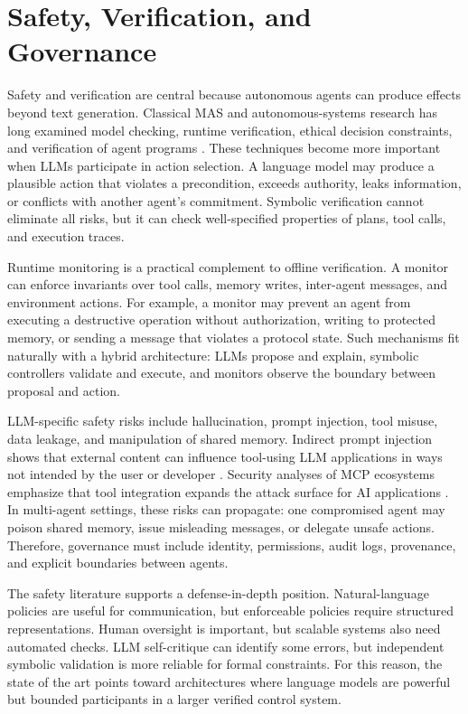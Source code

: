 \section{Safety, Verification, and Governance}

Safety and verification are central because autonomous agents can produce effects beyond text generation. Classical MAS and autonomous-systems research has long examined model checking, runtime verification, ethical decision constraints, and verification of agent programs \cite{fisher2013verifying,bordini2006model,dennis2016practical}. These techniques become more important when LLMs participate in action selection. A language model may produce a plausible action that violates a precondition, exceeds authority, leaks information, or conflicts with another agent's commitment. Symbolic verification cannot eliminate all risks, but it can check well-specified properties of plans, tool calls, and execution traces.

Runtime monitoring is a practical complement to offline verification. A monitor can enforce invariants over tool calls, memory writes, inter-agent messages, and environment actions. For example, a monitor may prevent an agent from executing a destructive operation without authorization, writing to protected memory, or sending a message that violates a protocol state. Such mechanisms fit naturally with a hybrid architecture: LLMs propose and explain, symbolic controllers validate and execute, and monitors observe the boundary between proposal and action.

LLM-specific safety risks include hallucination, prompt injection, tool misuse, data leakage, and manipulation of shared memory. Indirect prompt injection shows that external content can influence tool-using LLM applications in ways not intended by the user or developer \cite{greshake2023not}. Security analyses of MCP ecosystems emphasize that tool integration expands the attack surface for AI applications \cite{hou2025mcpsecurity}. In multi-agent settings, these risks can propagate: one compromised agent may poison shared memory, issue misleading messages, or delegate unsafe actions. Therefore, governance must include identity, permissions, audit logs, provenance, and explicit boundaries between agents.

The safety literature supports a defense-in-depth position. Natural-language policies are useful for communication, but enforceable policies require structured representations. Human oversight is important, but scalable systems also need automated checks. LLM self-critique can identify some errors, but independent symbolic validation is more reliable for formal constraints. For this reason, the state of the art points toward architectures where language models are powerful but bounded participants in a larger verified control system.

